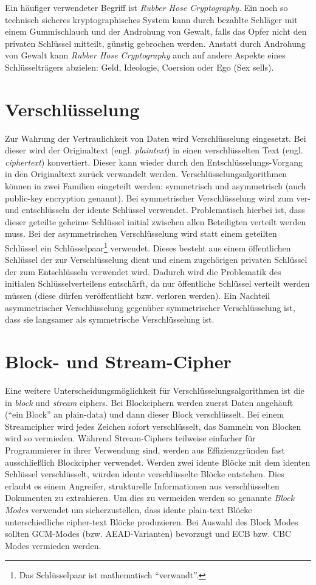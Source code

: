Ein häufiger verwendeter Begriff ist \textit{Rubber Hose Cryptography}. Ein noch so technisch sicheres kryptographisches System kann durch bezahlte Schläger mit einem Gummischlauch und der Androhung von Gewalt, falls das Opfer nicht den privaten Schlüssel mitteilt, günstig gebrochen werden. Anstatt durch Androhung von Gewalt kann \textit{Rubber Hose Cryptography} auch auf andere Aspekte eines Schlüsselträgers abzielen: Geld, Ideologie, Coersion oder Ego (Sex sells).

\section{Verschlüsselung}

Zur Wahrung der Vertraulichkeit von Daten wird Verschlüsselung eingesetzt. Bei dieser wird der Originaltext (engl. \textit{plaintext}) in einen verschlüsselten Text (engl. \textit{ciphertext}) konvertiert. Dieser kann wieder durch den Entschlüsselungs-Vorgang in den Originaltext zurück verwandelt werden. Verschlüsselungsalgorithmen können in zwei Familien eingeteilt werden: symmetrisch und asymmetrisch (auch public-key encryption genannt). Bei symmetrischer Verschlüsselung wird zum ver- und entschlüsseln der idente Schlüssel verwendet. Problematisch hierbei ist, dass dieser geteilte geheime Schlüssel initial zwischen allen Beteiligten verteilt werden muss. Bei der asymmetrischen Verschlüsselung wird statt einem geteilten Schlüssel ein Schlüsselpaar\footnote{Das Schlüsselpaar ist mathematisch ``verwandt''.} verwendet. Dieses besteht aus einem öffentlichen Schlüssel der zur Verschlüsselung dient und einem zugehörigen privaten Schlüssel der zum Entschlüsseln verwendet wird. Dadurch wird die Problematik des initialen Schlüsselverteilens entschärft, da nur öffentliche Schlüssel verteilt werden müssen (diese dürfen veröffentlicht bzw. verloren werden). Ein Nachteil asymmetrischer Verschlüsselung gegenüber symmetrischer Verschlüsselung ist, dass sie langsamer als symmetrische Verschlüsselung ist.

\section{Block- und Stream-Cipher}

Eine weitere Unterscheidungsmöglichkeit für Verschlüsselungsalgorithmen ist die in \textit{block} und \textit{stream} ciphers. Bei Blockciphern werden zuerst Daten angehäuft (``ein Block'' an plain-data) und dann dieser Block verschlüsselt. Bei einem Streamcipher wird jedes Zeichen sofort verschlüsselt, das Sammeln von Blocken wird so vermieden. Während Stream-Ciphers teilweise einfacher für Programmierer in ihrer Verwendung sind, werden aus Effizienzgründen fast ausschließlich Blockcipher verwendet. Werden zwei idente Blöcke mit dem identen Schlüssel verschlüsselt, würden idente verschlüsselte Blöcke entstehen. Dies erlaubt es einem Angreifer, strukturelle Informationen aus verschlüsselten Dokumenten zu extrahieren. Um dies zu vermeiden werden so genannte \textit{Block Modes} verwendet um sicherzustellen, dass idente plain-text Blöcke unterschiedliche cipher-text Blöcke produzieren. Bei Auswahl des Block Modes sollten GCM-Modes (bzw. AEAD-Varianten) bevorzugt und ECB bzw. CBC Modes vermieden werden.

